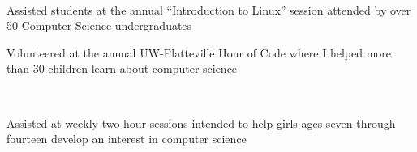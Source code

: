 \documentclass[]{hieudo-build}
\begin{document}
\begin{minipage}[t]{0.62\textwidth}
 \\
\begin{tightemize}
\item Assisted students at the annual “Introduction to Linux” session attended by over 50 Computer Science undergraduates
\item Volunteered at the annual UW-Platteville Hour of Code where I helped more than 30 children learn about computer science
\end{tightemize}
\smallsectionsep

 \\
\begin{tightemize}
\item Assisted at weekly two-hour sessions intended to help girls ages seven through fourteen develop an interest in computer science 
\end{tightemize}
\smallsectionsep

 \\
\sectionsep

\end{minipage} 
\end{document}
